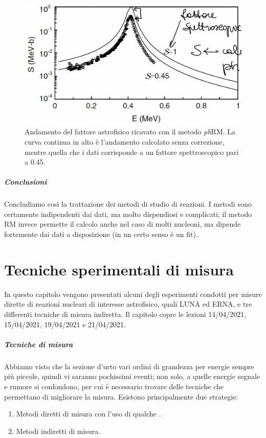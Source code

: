 \begin{figure}[h]
	\centering
	\includegraphics[scale=0.3]{Immagini/0414_RM2.png}
	\caption{Andamento del fattore astrofisico ricavato con il metodo \textit{ph}RM. La curva continua in alto è l'andamento calcolato senza correzione, mentre quella che  i dati corrisponde a un fattore spettroscopico pari a 0.45.}
	\label{0414_phRM2}
\end{figure}
\paragraph{Conclusioni} Concludiamo così la trattazione dei metodi di studio di reazioni. I metodi  sono certamente indipendenti dai dati, ma molto dispendiosi e complicati; il metodo RM invece permette il calcolo anche nel caso di molti nucleoni, ma dipende fortemente dai dati a disposizione (in un certo senso è un fit). 


\chapter{Tecniche sperimentali di misura}
In questo capitolo vengono presentati alcuni degli esperimenti condotti per misure dirette di reazioni nucleari di interesse astrofisico, quali LUNA ed ERNA, e tre differenti tecniche di misura indiretta. Il capitolo copre le lezioni 14/04/2021, 15/04/2021, 19/04/2021 e 21/04/2021.

\paragraph{Tecniche di misura} 
Abbiamo visto che la sezione d'urto  vari ordini di grandezza per energie sempre più piccole, quindi vi saranno pochissimi eventi; non solo, a quelle energie segnale e rumore si confondono, per cui è necessario trovare delle tecniche che permettano di migliorare la misura. Esistono principalmente due strategie:
\begin{enumerate}
	\item Metodi diretti di misura con l'uso di qualche .
	\item Metodi indiretti di misura.
\end{enumerate}

